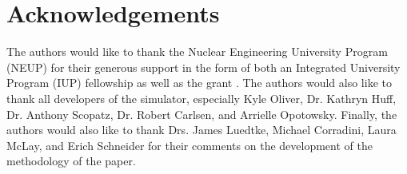 \documentclass[review]{elsarticle}
\begin{document}
 






%

\section*{Acknowledgements}

The authors would like to thank the Nuclear Engineering University Program
(NEUP) for their generous support in the form of both an Integrated University
Program (IUP) fellowship as well as the grant . The authors
would also like to thank all developers of the \Cyclus simulator, especially
Kyle Oliver, Dr. Kathryn Huff, Dr. Anthony Scopatz, Dr. Robert Carlsen, and
Arrielle Opotowsky. Finally, the authors would also like to thank Drs. James
Luedtke, Michael Corradini, Laura McLay, and Erich Schneider for their comments
on the development of the methodology of the paper.

\newpage
\section*{\refname}

\end{document}
